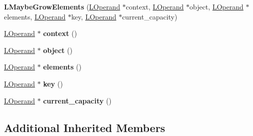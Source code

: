\begin{DoxyCompactItemize}
\item 
{\bfseries L\+Maybe\+Grow\+Elements} (\hyperlink{classv8_1_1internal_1_1_l_operand}{L\+Operand} $\ast$context, \hyperlink{classv8_1_1internal_1_1_l_operand}{L\+Operand} $\ast$object, \hyperlink{classv8_1_1internal_1_1_l_operand}{L\+Operand} $\ast$elements, \hyperlink{classv8_1_1internal_1_1_l_operand}{L\+Operand} $\ast$key, \hyperlink{classv8_1_1internal_1_1_l_operand}{L\+Operand} $\ast$current\+\_\+capacity)\hypertarget{classv8_1_1internal_1_1_l_maybe_grow_elements_aae48ee99b99d58f8e16bc264666c78ff}{}\label{classv8_1_1internal_1_1_l_maybe_grow_elements_aae48ee99b99d58f8e16bc264666c78ff}

\item 
\hyperlink{classv8_1_1internal_1_1_l_operand}{L\+Operand} $\ast$ {\bfseries context} ()\hypertarget{classv8_1_1internal_1_1_l_maybe_grow_elements_a6af5b70c66f542bb308ac9ada8cb6372}{}\label{classv8_1_1internal_1_1_l_maybe_grow_elements_a6af5b70c66f542bb308ac9ada8cb6372}

\item 
\hyperlink{classv8_1_1internal_1_1_l_operand}{L\+Operand} $\ast$ {\bfseries object} ()\hypertarget{classv8_1_1internal_1_1_l_maybe_grow_elements_a557ff494aa6f7b9a2a5f218005419b34}{}\label{classv8_1_1internal_1_1_l_maybe_grow_elements_a557ff494aa6f7b9a2a5f218005419b34}

\item 
\hyperlink{classv8_1_1internal_1_1_l_operand}{L\+Operand} $\ast$ {\bfseries elements} ()\hypertarget{classv8_1_1internal_1_1_l_maybe_grow_elements_aa58e07c5ac443be8021a0a6dbfe237cb}{}\label{classv8_1_1internal_1_1_l_maybe_grow_elements_aa58e07c5ac443be8021a0a6dbfe237cb}

\item 
\hyperlink{classv8_1_1internal_1_1_l_operand}{L\+Operand} $\ast$ {\bfseries key} ()\hypertarget{classv8_1_1internal_1_1_l_maybe_grow_elements_ac0b59ca4db13f2a31428c9b8063321dc}{}\label{classv8_1_1internal_1_1_l_maybe_grow_elements_ac0b59ca4db13f2a31428c9b8063321dc}

\item 
\hyperlink{classv8_1_1internal_1_1_l_operand}{L\+Operand} $\ast$ {\bfseries current\+\_\+capacity} ()\hypertarget{classv8_1_1internal_1_1_l_maybe_grow_elements_a8fc52ebb7ecf6d10f977d9b56cfe702d}{}\label{classv8_1_1internal_1_1_l_maybe_grow_elements_a8fc52ebb7ecf6d10f977d9b56cfe702d}

\end{DoxyCompactItemize}
\subsection*{Additional Inherited Members}


